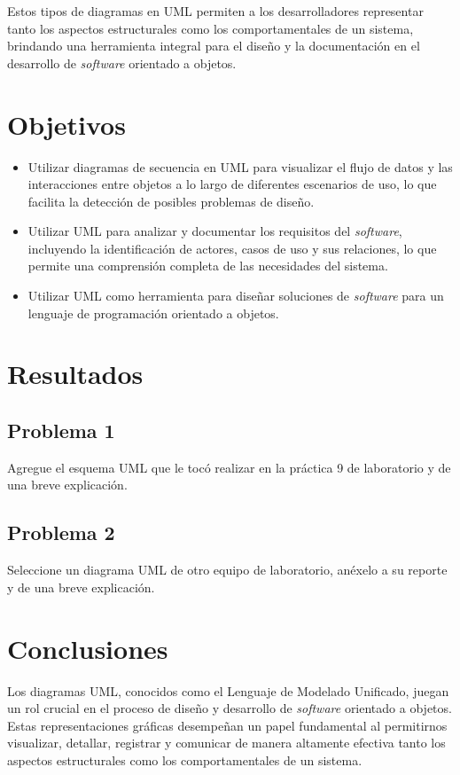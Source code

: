 \documentclass[11pt, twocolumn]{article}
\begin{document}
  Estos tipos de diagramas en UML permiten a los desarrolladores representar tanto los aspectos estructurales como los comportamentales de un sistema, brindando una herramienta integral para el diseño y la documentación en el desarrollo de \textit{software} orientado a objetos.

  \section*{Objetivos}
  \begin{itemize}
    \item Utilizar diagramas de secuencia en UML para visualizar el flujo de datos y las interacciones entre objetos a lo largo de diferentes escenarios de uso, lo que facilita la detección de posibles problemas de diseño.
    \item Utilizar UML para analizar y documentar los requisitos del \textit{software}, incluyendo la identificación de actores, casos de uso y sus relaciones, lo que permite una comprensión completa de las necesidades del sistema.
    \item Utilizar UML como herramienta para diseñar soluciones de \textit{software} para un lenguaje de programación orientado a objetos.
    
  \end{itemize}

  \section*{Resultados}
  \subsection*{Problema 1}
  Agregue el esquema UML que le tocó realizar en la práctica 9 de laboratorio y de una breve explicación.


  \subsection*{Problema 2}
  Seleccione un diagrama UML de otro equipo de laboratorio, anéxelo a su reporte y de una breve explicación.


  \section*{Conclusiones}
  Los diagramas UML, conocidos como el Lenguaje de Modelado Unificado, juegan un rol crucial en el proceso de diseño y desarrollo de \textit{software} orientado a objetos. Estas representaciones gráficas desempeñan un papel fundamental al permitirnos visualizar, detallar, registrar y comunicar de manera altamente efectiva tanto los aspectos estructurales como los comportamentales de un sistema.
\end{document}
